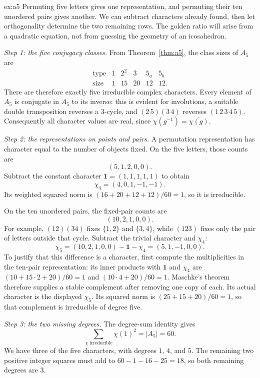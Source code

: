 \begin{solution}{ex:a5}
\idea Permuting five letters gives one representation, and permuting their ten unordered pairs gives another. We can subtract characters already found, then let orthogonality determine the two remaining rows. The golden ratio will arise from a quadratic equation, not from guessing the geometry of an icosahedron.

\writeup \emph{Step 1: the five conjugacy classes.}
From Theorem~\ref{thm:a5}, the class sizes of $A_5$ are
\[
\begin{array}{c|ccccc}
\text{type}&1&2^2&3&5_a&5_b\\\hline
\text{size}&1&15&20&12&12.
\end{array}
\]
There are therefore exactly five irreducible complex characters. Every element of $A_5$ is conjugate in $A_5$ to its inverse: this is evident for involutions, a suitable double transposition reverses a $3$-cycle, and $(2\,5)(3\,4)$ reverses $(1\,2\,3\,4\,5)$. Consequently all character values are real, since $\chi(g^{-1})=\overline{\chi(g)}$.

\emph{Step 2: the representations on points and pairs.}
A permutation representation has character equal to the number of objects fixed. On the five letters, those counts are
\[
(5,1,2,0,0).
\]
Subtract the constant character $\mathbf1=(1,1,1,1,1)$ to obtain
\[
\chi_4=(4,0,1,-1,-1).
\]
Its weighted squared norm is $(16+20+12+12)/60=1$, so it is irreducible.

On the ten unordered pairs, the fixed-pair counts are
\[
(10,2,1,0,0).
\]
For example, $(12)(34)$ fixes $\{1,2\}$ and $\{3,4\}$, while $(123)$ fixes only the pair of letters outside that cycle. Subtract the trivial character and $\chi_4$:
\[
\chi_5=(10,2,1,0,0)-\mathbf1-\chi_4
=(5,1,-1,0,0).
\]
To justify that this difference is a character, first compute the multiplicities in the ten-pair representation: its inner products with $\mathbf1$ and $\chi_4$ are $(10+15\cdot2+20)/60=1$ and $(10\cdot4+20)/60=1$. Maschke's theorem therefore supplies a stable complement after removing one copy of each. Its actual character is the displayed $\chi_5$. Its squared norm is $(25+15+20)/60=1$, so that complement is irreducible of degree five.

\emph{Step 3: the two missing degrees.}
The degree-sum identity gives
\[
\sum_{\chi\text{ irreducible}}\chi(1)^2=|A_5|=60.
\]
We have three of the five characters, with degrees $1$, $4$, and $5$. The remaining two positive integer squares must add to
$60-1-16-25=18$, so both remaining degrees are $3$.


\end{solution}
